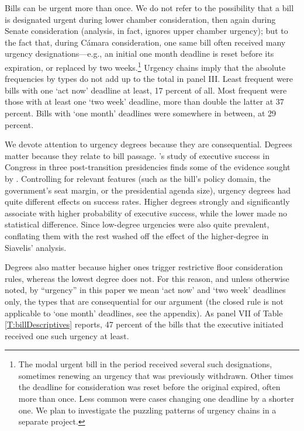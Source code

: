 \documentclass[letter,12pt]{article}
\begin{document}
Bills can be urgent more than once. We do not refer to the possibility that a bill is designated urgent during lower chamber consideration, then again during Senate consideration (analysis, in fact, ignores upper chamber urgency); but to the fact that, during Cámara consideration, one same bill often received many urgency designations---e.g., an initial one month deadline is reset before its expiration, or replaced by two weeks.\footnote{The modal urgent bill in the period received several such designations, sometimes renewing an urgency that was previously withdrawn. Other times the deadline for consideration was reset before the original expired, often more than once. Less common were cases changing one deadline by a shorter one. We plan to investigate the puzzling patterns of urgency chains in a separate project.} Urgency chains imply that the absolute frequencies by types do not add up to the total in panel III. Least frequent were bills with one `act now' deadline at least, 17 percent of all. Most frequent were those with at least one `two week' deadline, more than double the latter at 37 percent. Bills with `one month' deadlines were somewhere in between, at 29 percent.

We devote attention to urgency degrees because they are consequential. Degrees matter because they relate to bill passage. \citeauthor{aleman.navia.UrgChi.2009}'s \citeyearpar{aleman.navia.UrgChi.2009} study of executive success in Congress in three post-transition presidencies finds some of the evidence sought by \citet{siavelis.2002}. Controlling for relevant features (such as the bill's policy domain, the government's seat margin, or the presidential agenda size), urgency degrees had quite different effects on success rates. Higher degrees strongly and significantly associate with higher probability of executive success, while the lower made no statistical difference. Since low-degree urgencies were also quite prevalent, conflating them with the rest washed off the effect of the higher-degree in Siavelis' analysis. 


Degrees also matter because higher ones trigger restrictive floor consideration rules, whereas the lowest degree does not. For this reason, and unless otherwise noted, by ``urgency'' in this paper we mean `act now' and `two week' deadlines only, the types that are consequential for our argument (the closed rule is not applicable to `one month' deadlines, see the appendix). As panel VII of Table \ref{T:billDescriptives} reports, 47 percent of the bills that the executive initiated received one such urgency at least. 
\end{document}
